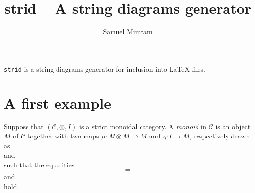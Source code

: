 \documentclass{article}
\title{strid -- A string diagrams generator}
\author{Samuel Mimram}
\begin{document}
\maketitle

\texttt{strid} is a string diagrams generator for inclusion into \LaTeX{} files.

\section{A first example}
Suppose that $(\mathcal{C},\otimes,I)$ is a strict monoidal category. A \emph{monoid} in $\mathcal{C}$ is an object $M$ of $\mathcal{C}$ together with two maps $\mu:M\otimes M\to M$ and $\eta:I\to M$, respectively drawn as
\[

\]
and
\[

\]
such that the equalities
\[

\quad=\quad

\]
and
\[
\]
hold.
\end{document}
